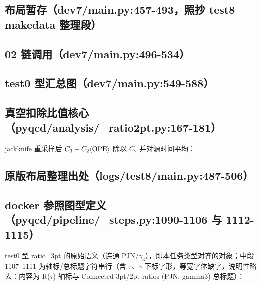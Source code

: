 \documentclass[UTF8]{ctexart}
\begin{document}
\subsection{布局暂存（dev7/main.py:457-493，照抄 test8 makedata 整理段）}


\subsection{02 链调用（dev7/main.py:496-534）}


\subsection{test0 型汇总图（dev7/main.py:549-588）}


\subsection{真空扣除比值核心（pyqcd/analysis/\_ratio2pt.py:167-181）}
jackknife 重采样后 $C_3-C_2\langle{\rm OPE}\rangle$ 除以 $C_2$ 并对源时间平均：


\subsection{原版布局整理出处（logs/test8/main.py:487-506）}


\subsection{docker 参照图型定义（pyqcd/pipeline/\_steps.py:1090-1106 与 1112-1115）}
test0 型 ratio\_3pt 的原始语义（连通 PJN/$\gamma_3$），即本任务类型对齐的对象；中段 1107--1111 为轴标/总标题字符串行（含 $\tau$、$\gamma$ 下标字形，等宽字体缺字，说明性略去：内容为 R($\tau$) 轴标与 Connected 3pt/2pt ratios (PJN, gamma3) 总标题）：


\end{document}
